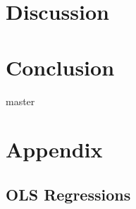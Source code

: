 \documentclass[11pt]{article}
\begin{document}
\section{Discussion}


\section{Conclusion}

\newpage
 {master}


\appendix
\setcounter{table}{0}
\setcounter{figure}{0}
\setcounter{equation}{0}
\renewcommand\thetable{\Alph{section}.\arabic{table}}
\renewcommand\thefigure{\Alph{section}.\arabic{figure}}
\renewcommand\theequation{\Alph{section}.\arabic{equation}}%

\newpage


\section{Appendix}
\subsection{OLS Regressions} \label{sec:OLS_append}

\end{document}
